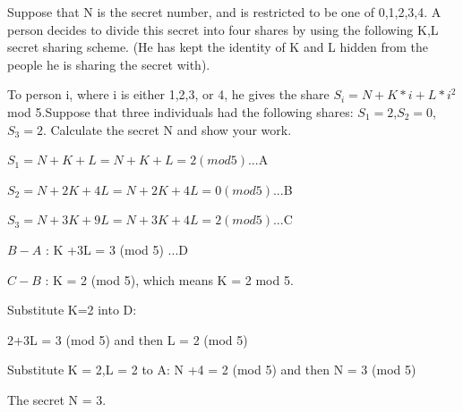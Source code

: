 \question Suppose that N is the secret number, and is restricted to be one of 0,1,2,3,4.
A person decides to divide this secret into four shares by using the following K,L secret sharing scheme. (He has kept the identity of K and L hidden from the people he is sharing the secret with).


To person i, where i is either 1,2,3, or 4, he gives the share $S_{i} = N +K*i+L*i^{2}$ mod 5.Suppose that three individuals had the following shares: $S_{1} = 2$,$S_{2} = 0$,$S_{3} = 2$. Calculate the secret N and show your work.

\begin{solution}
$S_{1} = N +K +L = N +K +L = 2 (mod 5) $...A

$S_{2} = N +2K +4L = N +2K +4L = 0 (mod 5) $...B

$S_{3} = N +3K +9L = N +3K +4L = 2 (mod 5) $...C

$B - A$ : K +3L = 3 (mod 5) ...D

$C - B$ : K = 2 (mod 5), which means K = 2 mod 5.

Substitute K=2 into D:

2+3L = 3 (mod 5) and then L = 2 (mod 5)

Substitute K = 2,L = 2 to A: N +4 = 2 (mod 5) and then N = 3 (mod 5)

The secret N = 3.

\end{solution}
\newpage